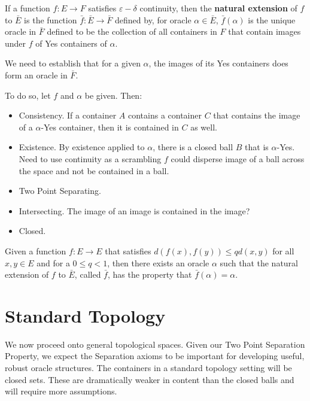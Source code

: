 \begin{definition}
If a function $f:E \to F$ satisfies $\varepsilon-\delta$ continuity, then the \textbf{natural extension} of $f$ to $\bar{E}$ is the function $\bar{f}:\bar{E} \to \bar{F}$ defined by, for oracle $\alpha \in \bar{E}$, $\bar{f}(\alpha)$ is the unique oracle in $\bar{F}$ defined to be the collection of all containers in $F$ that contain images under $f$ of Yes containers of $\alpha$. 
\end{definition}

We need to establish that for a given $\alpha$, the images of its Yes containers does form an oracle in $\bar{F}$. 

To do so, let $f$ and $\alpha$ be given. Then: 

\begin{itemize}
    \item Consistency. If a container $A$ contains a container $C$ that contains the image of a $\alpha$-Yes container, then it is contained in $C$ as well.
    \item Existence. By existence applied to $\alpha$, there is a closed ball $B$ that is $\alpha$-Yes. Need to use continuity as a scrambling $f$ could disperse image of a ball across the space and not be contained in a ball. 
    \item Two Point Separating.
    \item Intersecting. The image of an image is contained in the image? 
    \item Closed. 
\end{itemize}

\begin{proposition}
    Given a function $f:E \to E$ that satisfies $d(f(x), f(y)) \leq q d(x, y)$ for all $x, y \in E$ and for a $0 \leq q < 1$, then there exists an oracle $\alpha$ such that the natural extension of $f$ to $\bar{E}$, called $\bar{f}$, has the property that $\bar{f}(\alpha) = \alpha$.
\end{proposition}



\section{Standard Topology}

We now proceed onto general topological spaces. Given our Two Point Separation Property, we expect the Separation axioms to be important for developing useful, robust oracle structures. The containers in a standard topology setting will be closed sets. These are dramatically weaker in content than the closed balls and will require more assumptions. 

